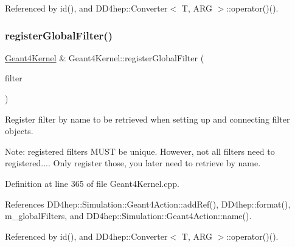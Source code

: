 Referenced by id(), and D\+D4hep\+::\+Converter$<$ T, A\+R\+G $>$\+::operator()().

\hypertarget{class_d_d4hep_1_1_simulation_1_1_geant4_kernel_a0690ca4b44a14133f0c8562eebac9613}{}\label{class_d_d4hep_1_1_simulation_1_1_geant4_kernel_a0690ca4b44a14133f0c8562eebac9613} 
\subsubsection{\texorpdfstring{register\+Global\+Filter()}{registerGlobalFilter()}}
{\footnotesize\ttfamily \hyperlink{class_d_d4hep_1_1_simulation_1_1_geant4_kernel}{Geant4\+Kernel} \& Geant4\+Kernel\+::register\+Global\+Filter (\begin{DoxyParamCaption}\item[{\hyperlink{class_d_d4hep_1_1_simulation_1_1_geant4_action}{Geant4\+Action} $\ast$}]{filter }\end{DoxyParamCaption})}



Register filter by name to be retrieved when setting up and connecting filter objects. 

Note\+: registered filters M\+U\+ST be unique. However, not all filters need to registered.... Only register those, you later need to retrieve by name. 

Definition at line 365 of file Geant4\+Kernel.\+cpp.



References D\+D4hep\+::\+Simulation\+::\+Geant4\+Action\+::add\+Ref(), D\+D4hep\+::format(), m\+\_\+global\+Filters, and D\+D4hep\+::\+Simulation\+::\+Geant4\+Action\+::name().



Referenced by id(), and D\+D4hep\+::\+Converter$<$ T, A\+R\+G $>$\+::operator()().

\hypertarget{class_d_d4hep_1_1_simulation_1_1_geant4_kernel_a3d2e1d38ae072b26c0a9124268065fbc}{}\label{class_d_d4hep_1_1_simulation_1_1_geant4_kernel_a3d2e1d38ae072b26c0a9124268065fbc} 
